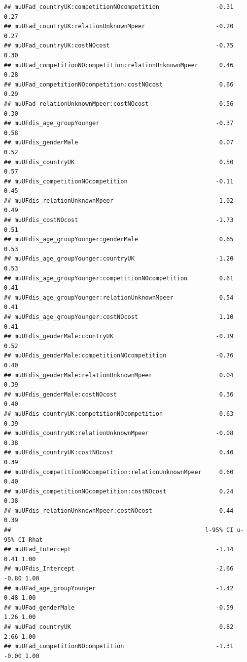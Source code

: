 \documentclass[
]{article}
\begin{document}
\begin{verbatim}
## muUFad_countryUK:competitionNOcompetition                -0.31      0.27
## muUFad_countryUK:relationUnknownMpeer                    -0.20      0.27
## muUFad_countryUK:costNOcost                              -0.75      0.30
## muUFad_competitionNOcompetition:relationUnknownMpeer      0.46      0.28
## muUFad_competitionNOcompetition:costNOcost                0.66      0.29
## muUFad_relationUnknownMpeer:costNOcost                    0.56      0.30
## muUFdis_age_groupYounger                                 -0.37      0.58
## muUFdis_genderMale                                        0.07      0.52
## muUFdis_countryUK                                         0.50      0.57
## muUFdis_competitionNOcompetition                         -0.11      0.45
## muUFdis_relationUnknownMpeer                             -1.02      0.49
## muUFdis_costNOcost                                       -1.73      0.51
## muUFdis_age_groupYounger:genderMale                       0.65      0.53
## muUFdis_age_groupYounger:countryUK                       -1.20      0.53
## muUFdis_age_groupYounger:competitionNOcompetition         0.61      0.41
## muUFdis_age_groupYounger:relationUnknownMpeer             0.54      0.41
## muUFdis_age_groupYounger:costNOcost                       1.10      0.41
## muUFdis_genderMale:countryUK                             -0.19      0.52
## muUFdis_genderMale:competitionNOcompetition              -0.76      0.40
## muUFdis_genderMale:relationUnknownMpeer                   0.04      0.39
## muUFdis_genderMale:costNOcost                             0.36      0.40
## muUFdis_countryUK:competitionNOcompetition               -0.63      0.39
## muUFdis_countryUK:relationUnknownMpeer                   -0.08      0.38
## muUFdis_countryUK:costNOcost                              0.40      0.39
## muUFdis_competitionNOcompetition:relationUnknownMpeer     0.60      0.40
## muUFdis_competitionNOcompetition:costNOcost               0.24      0.38
## muUFdis_relationUnknownMpeer:costNOcost                   0.44      0.39
##                                                       l-95% CI u-95% CI Rhat
## muUFad_Intercept                                         -1.14     0.41 1.00
## muUFdis_Intercept                                        -2.66    -0.80 1.00
## muUFad_age_groupYounger                                  -1.42     0.48 1.00
## muUFad_genderMale                                        -0.59     1.26 1.00
## muUFad_countryUK                                          0.82     2.66 1.00
## muUFad_competitionNOcompetition                          -1.31    -0.00 1.00

\end{verbatim}
\end{document}
